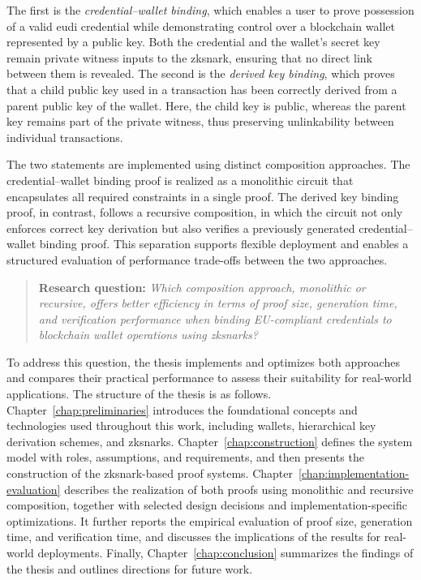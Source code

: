 The first is the \emph{credential–wallet binding}, which enables a user to prove possession of a valid \acrshort{eudi} credential while demonstrating control over a blockchain wallet represented by a public key. Both the credential and the wallet’s secret key remain private witness inputs to the \acrshort{zksnark}, ensuring that no direct link between them is revealed. The second is the \emph{derived key binding}, which proves that a child public key used in a transaction has been correctly derived from a parent public key of the wallet. Here, the child key is public, whereas the parent key remains part of the private witness, thus preserving unlinkability between individual transactions.

\medskip
The two statements are implemented using distinct composition approaches. The credential–wallet binding proof is realized as a monolithic circuit that encapsulates all required constraints in a single proof. The derived key binding proof, in contrast, follows a recursive composition, in which the circuit not only enforces correct key derivation but also verifies a previously generated credential–wallet binding proof. This separation supports flexible deployment and enables a structured evaluation of performance trade-offs between the two approaches.
\begin{quote}
	\textbf{Research question:} 
	\textit{Which composition approach, monolithic or recursive, offers better efficiency in terms of proof size, generation time, and verification performance when binding EU-compliant credentials to blockchain wallet operations using \acrshort{zksnark}s?}
\end{quote}
To address this question, the thesis implements and optimizes both approaches and compares their practical performance to assess their suitability for real-world applications. The structure of the thesis is as follows. Chapter~\ref{chap:preliminaries} introduces the foundational concepts and technologies used throughout this work, including wallets, hierarchical key derivation schemes, and \acrshort{zksnark}s. Chapter~\ref{chap:construction} defines the system model with roles, assumptions, and requirements, and then presents the construction of the \acrshort{zksnark}-based proof systems. Chapter~\ref{chap:implementation-evaluation} describes the realization of both proofs using monolithic and recursive composition, together with selected design decisions and implementation-specific optimizations. It further reports the empirical evaluation of proof size, generation time, and verification time, and discusses the implications of the results for real-world deployments. Finally, Chapter~\ref{chap:conclusion} summarizes the findings of the thesis and outlines directions for future work.

